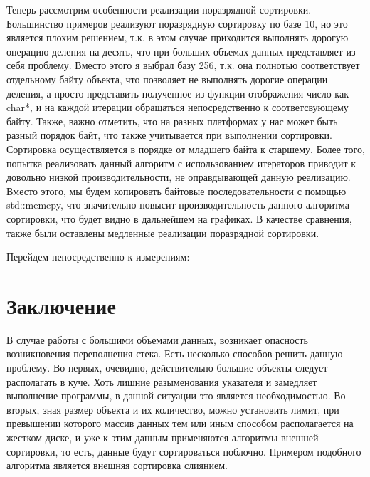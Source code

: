 \documentclass[a4paper, 14pt]{report}
\begin{document}
Теперь рассмотрим особенности реализации поразрядной сортировки. Большинство примеров реализуют поразрядную сортировку по базе 10, но это является плохим решением, т.к. в этом случае приходится выполнять дорогую операцию деления на десять, что при больших объемах данных представляет из себя проблему. Вместо этого я выбрал базу 256, т.к. она полнотью соответствует отдельному байту объекта, что позволяет не выполнять дорогие операции деления, а просто представить полученное из функции отображения число как char*, и на каждой итерации обращаться непосредственно к соответсвующему байту. Также, важно отметить, что на разных платформах у нас может быть разный порядок байт, что также учитывается при выполнении сортировки. Сортировка осуществляется в порядке от младшего байта к старшему. Более того, попытка реализовать данный алгоритм с использованием итераторов приводит к довольно низкой производительности, не оправдывающей данную реализацию. Вместо этого, мы будем копировать байтовые последовательности с помощью std::memcpy, что значительно повысит производительность данного алгоритма сортировки, что будет видно в дальнейшем на графиках. В качестве сравнения, также были оставлены медленные реализации поразрядной сортировки.

Перейдем непосредственно к измерениям:

\section{Заключение}
В случае работы с большими объемами данных, возникает опасность возникновения переполнения стека. Есть несколько способов решить данную проблему. Во-первых, очевидно, действительно большие объекты следует располагать в куче. Хоть лишние разыменования указателя и замедляет выполнение программы, в данной ситуации это является необходимостью. Во-вторых, зная размер объекта и их количество, можно установить лимит, при превышении которого массив данных тем или иным способом располагается на жестком диске, и уже к этим данным применяются алгоритмы внешней сортировки, то есть, данные будут сортироваться поблочно. Примером подобного алгоритма является внешняя сортировка слиянием.
\end{document}
